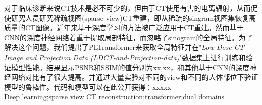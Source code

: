 对于临床诊断来说CT技术是必不可少的，但由于CT使用有害的电离辐射，从而促使研究人员研究稀疏视图(sparse-view)CT重建，即从稀疏的singram视图集恢复高质量的CT图像。近年来基于深度学习的方法被广泛应用于CT重建。然而基于CNN的深度神经网络着重于提取局部特征，而忽略了sinogram的全局特征。为了解决这个问题，我们提出了PLTransformer来获取全局特征并在"\emph{Low Dose CT Image and Projection Data (LDCT-and-Projection-data)}"数据集上进行训练和验证模型性能。结果显示PSNR和SSIM的值分别为xx,xx，和其他基于CNN的深度神经网络对比有了很大提高。并通过大量实验对不同的view和不同的人体部位下验证模型的鲁棒性。代码和模型可以在此公开获得：xxxxx\\

Deep learning;sparse view CT reconstruction;transformer;dual domains